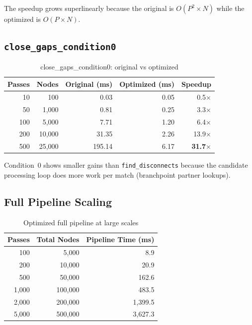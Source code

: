 \documentclass[11pt,a4paper]{article}
\begin{document}
The speedup grows superlinearly because the original is $O(P^2 \times N)$ while the optimized is $O(P \times N)$.

\subsection{\texttt{close\_gaps\_condition0}}

\begin{table}[H]
\centering
\caption{close\_gaps\_condition0: original vs optimized}
\begin{tabular}{rrrrr}
\toprule
\textbf{Passes} & \textbf{Nodes} & \textbf{Original (ms)} & \textbf{Optimized (ms)} & \textbf{Speedup} \\
\midrule
10 & 100 & 0.03 & 0.05 & 0.5$\times$ \\
50 & 1,000 & 0.81 & 0.25 & 3.3$\times$ \\
100 & 5,000 & 7.71 & 1.20 & 6.4$\times$ \\
200 & 10,000 & 31.35 & 2.26 & 13.9$\times$ \\
500 & 25,000 & 195.14 & 6.17 & \textbf{31.7$\times$} \\
\bottomrule
\end{tabular}
\end{table}

Condition~0 shows smaller gains than \texttt{find\_disconnects} because the candidate processing loop does more work per match (branchpoint partner lookups).

\subsection{Full Pipeline Scaling}

\begin{table}[H]
\centering
\caption{Optimized full pipeline at large scales}
\begin{tabular}{rrr}
\toprule
\textbf{Passes} & \textbf{Total Nodes} & \textbf{Pipeline Time (ms)} \\
\midrule
100 & 5,000 & 8.9 \\
200 & 10,000 & 20.9 \\
500 & 50,000 & 162.6 \\
1,000 & 100,000 & 483.5 \\
2,000 & 200,000 & 1,399.5 \\
5,000 & 500,000 & 3,627.3 \\
\bottomrule
\end{tabular}
\end{table}
\end{document}
